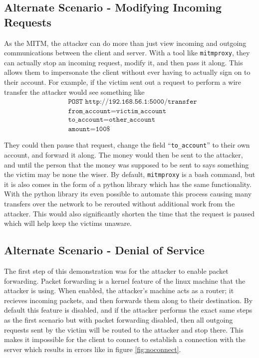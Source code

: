 \documentclass[11pt]{article}
\begin{document}
\subsection{Alternate Scenario - Modifying Incoming Requests}
\par As the MITM, the attacker can do more than just view incoming and outgoing communications between the client and server. With a tool like \texttt{mitmproxy}, they can actually stop an incoming request, modify it, and then pass it along. This allows them to impersonate the client without ever having to actually sign on to their account. For example, if the victim sent out a request to perform a wire transfer the attacker would see something like
\begin{align*}
    & \texttt{POST http://192.168.56.1:5000/transfer} \\
    & \texttt{from\_account=victim\_account} \\
    & \texttt{to\_account=other\_account} \\
    & \texttt{amount=100}\$
\end{align*}

\par They could then pause that request, change the field ``\texttt{to\_account}'' to their own account, and forward it along. The money would then be sent to the attacker, and until the person that the money was supposed to be sent to says something the victim may be none the wiser. By default, \texttt{mitmproxy} is a bash command, but it is also comes in the form of a python library which has the same functionality. With the python library its even possible to automate this process causing many transfers over the network to be rerouted without additional work from the attacker. This would also significantly shorten the time that the request is paused which will help keep the victims unaware.

\subsection{Alternate Scenario - Denial of Service}
\par The first step of this demonstration was for the attacker to enable packet forwarding. Packet forwarding is a kernel feature of the linux machine that the attacker is using. When enabled, the attacker's machine acts as a router; it recieves incoming packets, and then forwards them along to their destination. By default this feature is disabled, and if the attacker performs the exact same steps as the first scenario but with packet forwarding disabled, then all outgoing requests sent by the victim will be routed to the attacker and stop there. This makes it impossible for the client to connect to establish a connection with the server which results in errors like in figure \ref{fig:noconnect}.
\end{document}

